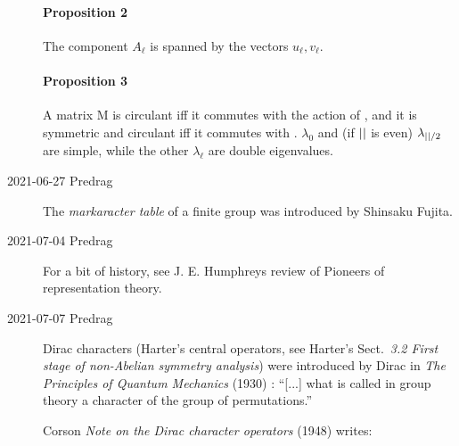 \begin{description}
\paragraph{Proposition 2}
The component $A_{\ell}$ is spanned by the vectors $u_{\ell},v_{\ell}$.

\paragraph{Proposition 3}
A matrix M is circulant iff it commutes with the action of \Cn{\cl{}}, and it
is symmetric and circulant iff it commutes with \Dn{\cl{}}.
$\lambda_0$ and (if ${||}$ is even) $\lambda_{{||}/2}$ are simple, while
the other $\lambda_{\ell}$ are double eigenvalues.

\item[2021-06-27 Predrag]
The \emph{markaracter table} of a finite group was introduced by Shinsaku Fujita.

\item[2021-07-04 Predrag]
For a bit of history, see J. E. Humphreys review of
{Pioneers of representation theory}.

\item[2021-07-07 Predrag]

Dirac characters (Harter's central operators, see
{Harter's Sect.}~{\em 3.2 First stage of non-Abelian symmetry analysis})
were introduced by Dirac in {\em The Principles of Quantum Mechanics}
(1930) :
``[...] what is called in group theory a character of the group of
permutations.''

Corson {\em Note on the {Dirac} character operators}
(1948) writes:


\end{description}
